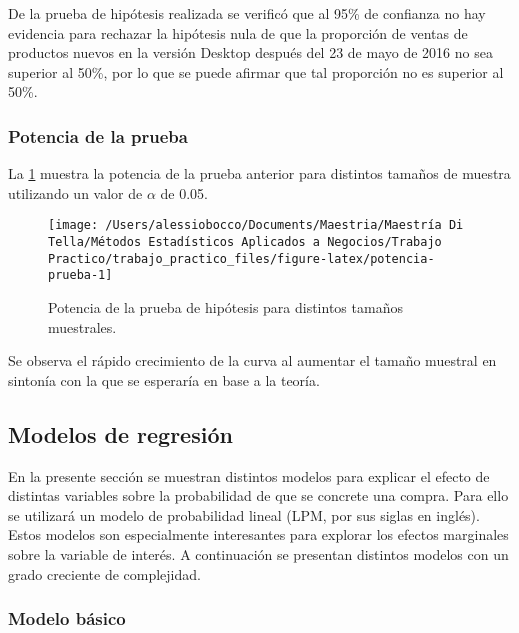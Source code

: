 \documentclass[
  12pt]{article}
\begin{document}
De la prueba de hipótesis realizada se verificó que al 95\% de confianza no hay evidencia para rechazar la hipótesis nula de que la proporción de ventas de productos nuevos en la versión Desktop después del 23 de mayo de 2016 no sea superior al 50\%, por lo que se puede afirmar que tal proporción no es superior al 50\%.

\hypertarget{potencia-de-la-prueba}{%
\subsubsection{Potencia de la prueba}\label{potencia-de-la-prueba}}

La \ref{fig:potencia-prueba} muestra la potencia de la prueba anterior para distintos tamaños de muestra utilizando un valor de \(\alpha\) de 0.05.

\begin{figure}

{\centering \texttt{[image: /Users/alessiobocco/Documents/Maestria/Maestría Di Tella/Métodos Estadísticos Aplicados a Negocios/Trabajo Practico/trabajo\_practico\_files/figure-latex/potencia-prueba-1]} 

}

\caption{Potencia de la prueba de hipótesis para distintos tamaños muestrales.}\label{fig:potencia-prueba}
\end{figure}

Se observa el rápido crecimiento de la curva al aumentar el tamaño muestral en sintonía con la que se esperaría en base a la teoría.

\hypertarget{modelos-de-regresiuxf3n}{%
\subsection{Modelos de regresión}\label{modelos-de-regresiuxf3n}}

En la presente sección se muestran distintos modelos para explicar el efecto de distintas variables sobre la probabilidad de que se concrete una compra. Para ello se utilizará un modelo de probabilidad lineal (LPM, por sus siglas en inglés). Estos modelos son especialmente interesantes para explorar los efectos marginales sobre la variable de interés. A continuación se presentan distintos modelos con un grado creciente de complejidad.

\hypertarget{modelo-buxe1sico}{%
\subsubsection{Modelo básico}\label{modelo-buxe1sico}}
\end{document}
